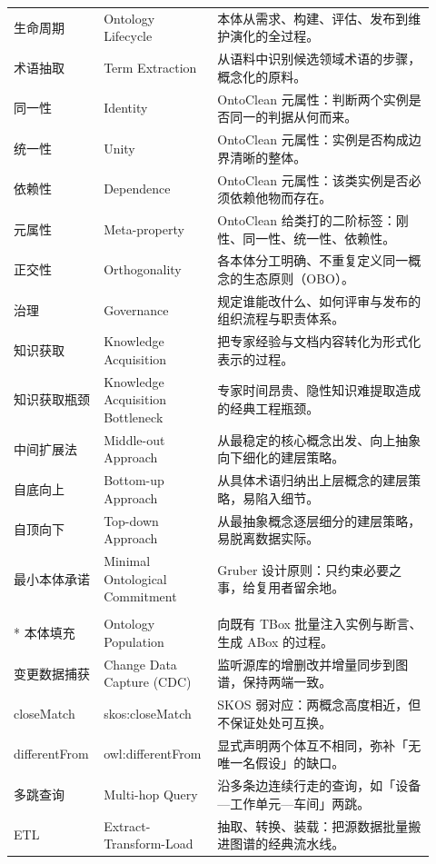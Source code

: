 \begin{longtable}{@{}p{0.16\linewidth}p{0.26\linewidth}p{0.5\linewidth}@{}}
生命周期 & Ontology Lifecycle & 本体从需求、构建、评估、发布到维护演化的全过程。 \\
术语抽取 & Term Extraction & 从语料中识别候选领域术语的步骤，概念化的原料。 \\
同一性 & Identity & OntoClean 元属性：判断两个实例是否同一的判据从何而来。 \\
统一性 & Unity & OntoClean 元属性：实例是否构成边界清晰的整体。 \\
依赖性 & Dependence & OntoClean 元属性：该类实例是否必须依赖他物而存在。 \\
元属性 & Meta-property & OntoClean 给类打的二阶标签：刚性、同一性、统一性、依赖性。 \\
正交性 & Orthogonality & 各本体分工明确、不重复定义同一概念的生态原则（OBO）。 \\
治理 & Governance & 规定谁能改什么、如何评审与发布的组织流程与职责体系。 \\
知识获取 & Knowledge Acquisition & 把专家经验与文档内容转化为形式化表示的过程。 \\
知识获取瓶颈 & Knowledge Acquisition Bottleneck & 专家时间昂贵、隐性知识难提取造成的经典工程瓶颈。 \\
中间扩展法 & Middle-out Approach & 从最稳定的核心概念出发、向上抽象向下细化的建层策略。 \\
自底向上 & Bottom-up Approach & 从具体术语归纳出上层概念的建层策略，易陷入细节。 \\
自顶向下 & Top-down Approach & 从最抽象概念逐层细分的建层策略，易脱离数据实际。 \\
最小本体承诺 & Minimal Ontological Commitment & Gruber 设计原则：只约束必要之事，给复用者留余地。 \\
\addlinespace[10pt]
\multicolumn{3}{@{}l}{\textbf{——知识图谱工程——}} \\*
\addlinespace[3pt]
本体填充 & Ontology Population & 向既有 TBox 批量注入实例与断言、生成 ABox 的过程。 \\
变更数据捕获 & Change Data Capture (CDC) & 监听源库的增删改并增量同步到图谱，保持两端一致。 \\
closeMatch & skos:closeMatch & SKOS 弱对应：两概念高度相近，但不保证处处可互换。 \\
differentFrom & owl:differentFrom & 显式声明两个体互不相同，弥补「无唯一名假设」的缺口。 \\
多跳查询 & Multi-hop Query & 沿多条边连续行走的查询，如「设备—工作单元—车间」两跳。 \\
ETL & Extract-Transform-Load & 抽取、转换、装载：把源数据批量搬进图谱的经典流水线。 \\

\end{longtable}
